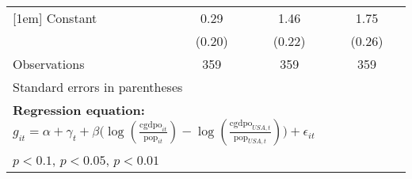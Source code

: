 \begin{sidewaystable}[htbp]
\begin{tabular}{l*{3}{c}}
[1em]
Constant        &     0.29         &     1.46\sym{***}&     1.75\sym{***}\\
                &   (0.20)         &   (0.22)         &   (0.26)         \\
\hline
Observations    &      359         &      359         &      359         \\
\hline\hline
\multicolumn{4}{l}{\footnotesize Standard errors in parentheses}\\
\multicolumn{4}{l}{\footnotesize \textbf{Regression equation:} \(g_{it} = \alpha + \gamma_t + \beta \big(\log (\frac{\textrm{cgdpo}_{it}}{\textrm{pop}_{it}} ) - \log (\frac{\textrm{cgdpo}_{USA,t}}{\textrm{pop}_{USA,t}}  ) \big) + \epsilon_{it}\)}\\
\multicolumn{4}{l}{\footnotesize \sym{*} \(p<0.1\), \sym{**} \(p<0.05\), \sym{***} \(p<0.01\)}\\
\end{tabular}
\end{sidewaystable}
